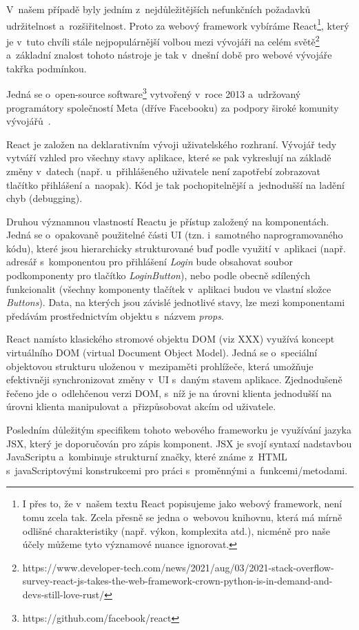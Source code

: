 V~našem případě byly jedním z~nejdůležitějších nefunkčních požadavků udržitelnost a~rozšiřitelnost. Proto za webový framework vybíráme React\footnote{I přes to, že v~našem textu React popisujeme jako webový framework, není tomu zcela tak. Zcela přesně se jedna o~webovou knihovnu, která má mírně odlišné charakteristiky (např. výkon, komplexita atd.), nicméně pro naše účely můžeme tyto významové nuance ignorovat.}, který je v~tuto chvíli stále nejpopulárnější volbou mezi vývojáři na celém světě\footnote{https://www.developer-tech.com/news/2021/aug/03/2021-stack-overflow-survey-react-js-takes-the-web-framework-crown-python-is-in-demand-and-devs-still-love-rust/} a~základní znalost tohoto nástroje je tak v~dnešní době pro webové vývojáře takřka podmínkou.

Jedná se o~open-source software\footnote{https://github.com/facebook/react} vytvořený v~roce 2013 a~udržovaný programátory společností Meta (dříve Facebooku) za podpory široké komunity vývojářů~\parencite{react}.

React je založen na deklarativním vývoji uživatelského rozhraní. Vývojář tedy vytváří vzhled pro všechny stavy aplikace, které se pak vykreslují na základě změny v~datech (např. u~přihlášeného uživatele není zapotřebí zobrazovat tlačítko přihlášení a~naopak). Kód je tak pochopitelnější a~jednodušší na ladění chyb (debugging).

Druhou významnou vlastností Reactu je přístup založený na komponentách. Jedná se o~opakovaně použitelné části UI (tzn. i~samotného naprogramovaného kódu), které jsou hierarchicky strukturované buď podle využití v~aplikaci (např. adresář s~komponentou pro přihlášení \emph{Login} bude obsahovat soubor podkomponenty pro tlačítko \emph{LoginButton}), nebo podle obecně sdílených funkcionalit (všechny komponenty tlačítek v~aplikaci budou ve vlastní složce \emph{Buttons}). Data, na kterých jsou závislé jednotlivé stavy, lze mezi komponentami předávám prostřednictvím objektu s~názvem \emph{props}.

React namísto klasického stromové objektu DOM (viz XXX) využívá koncept virtuálního DOM (virtual Document Object Model). Jedná se o~speciální objektovou strukturu uloženou v~mezipaměti prohlížeče, která umožňuje efektivněji synchronizovat změny v~UI s~daným stavem aplikace. Zjednodušeně řečeno jde o~odlehčenou verzi DOM, s~níž je na úrovni klienta jednodušší na úrovni klienta manipulovat a~přizpůsobovat akcím od uživatele.

Posledním důležitým specifikem tohoto webového frameworku je využívání jazyka JSX, který je doporučován pro zápis komponent. JSX je svojí syntaxí nadstavbou JavaScriptu a~kombinuje strukturní značky, které známe z~HTML s~javaScriptovými konstrukcemi pro práci s~proměnnými a~funkcemi/metodami.

